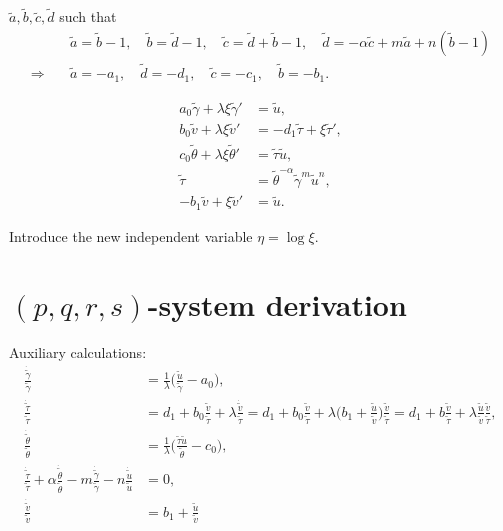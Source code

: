 \documentclass[a4paper,11pt]{article}
\def\tg{{\tilde{\gamma}}}
\def\tv{{\tilde{v}}}
\def\tth{{\tilde{\theta}}}
\def\ts{{\tilde{\tau}}}
\def\tu{{\tilde{u}}}
\def\dtg{\dot{\tilde{\gamma}}}
\def\dtv{\dot{\tilde{v}}}
\def\dtth{\dot{\tilde{\theta}}}
\def\dts{\dot{\tilde{\tau}}}
\def\dtu{\dot{\tilde{u}}}
\def\ta{{\tilde{a}}}
\def\tb{{\tilde{b}}}
\def\tc{{\tilde{c}}}
\def\td{{\tilde{d}}}
\begin{document}
$\ta, \tb, \tc, \td$ such that
\begin{align*}
 &\ta=\tb-1, \quad \tb=\td-1, \quad \tc=\td+\tb-1,\quad \td = -\alpha \tc + m\ta +n(\tb-1) \\
 \Longrightarrow \quad&\ta = -a_1, \quad \td = -d_1, \quad \tc = -c_1, \quad \tb=-b_1.
\end{align*}

\begin{equation}
 \begin{aligned}
  a_0\tg + \lambda\xi\tg' &=\tu,\\
  b_0\tv + \lambda\xi\tv' &=-d_1 \ts + \xi\ts',\\
  c_0\tth+ \lambda\xi\tth'&=\ts\tu,\\
  \ts &=\tth^{-\alpha}\tg^m\tu^n,\\
  -b_1\tv+\xi\tv' &= \tu.
 \end{aligned}
\end{equation}

Introduce the new independent variable $\eta = \log\xi$.
\section{$(p,q,r,s)$-system derivation}
Auxiliary calculations:
\begin{align*}
 \frac{\dtg}{\tg} &= \frac{1}{\lambda }\Big(\frac{\tu}{\tg}-a_0\Big),\\
 \frac{\dts}{\ts} &= d_1+ b_0\frac{\tv}{\ts} + \lambda \frac{\dtv}{\ts} = d_1+ b_0\frac{\tv}{\ts} + \lambda \Big(b_1 + \frac{\tu}{\tv}\Big)\frac{\tv}{\ts} = d_1 + b\frac{\tv}{\ts} + \lambda\frac{\tu}{\tv}\frac{\tv}{\ts} ,\\
 \frac{\dtth}{\tth}&=\frac{1}{\lambda }\Big(\frac{\ts\tu}{\tth}-c_0\Big),\\
 \frac{\dts}{\ts} +\alpha \frac{\dtth}{\tth} - m \frac{\dtg}{\tg} - n\frac{\dtu}{\tu}&=0,\\
 \frac{\dtv}{\tv}&= b_1 +\frac{\tu}{\tv}
\end{align*}
\end{document}
